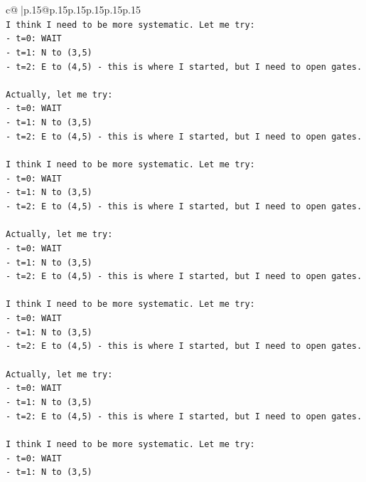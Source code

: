 \documentclass{article}
\begin{document}
{\begin{supertabular}{c@{$\;$}|p{.15\linewidth}@{}p{.15\linewidth}p{.15\linewidth}p{.15\linewidth}p{.15\linewidth}p{.15\linewidth}}
{{{\\ 
\texttt{I think I need to be more systematic. Let me try:} \\
\texttt{{-} t=0: WAIT} \\
\texttt{{-} t=1: N to (3,5)} \\
\texttt{{-} t=2: E to (4,5) {-} this is where I started, but I need to open gates.} \\
\\ 
\texttt{Actually, let me try:} \\
\texttt{{-} t=0: WAIT} \\
\texttt{{-} t=1: N to (3,5)} \\
\texttt{{-} t=2: E to (4,5) {-} this is where I started, but I need to open gates.} \\
\\ 
\texttt{I think I need to be more systematic. Let me try:} \\
\texttt{{-} t=0: WAIT} \\
\texttt{{-} t=1: N to (3,5)} \\
\texttt{{-} t=2: E to (4,5) {-} this is where I started, but I need to open gates.} \\
\\ 
\texttt{Actually, let me try:} \\
\texttt{{-} t=0: WAIT} \\
\texttt{{-} t=1: N to (3,5)} \\
\texttt{{-} t=2: E to (4,5) {-} this is where I started, but I need to open gates.} \\
\\ 
\texttt{I think I need to be more systematic. Let me try:} \\
\texttt{{-} t=0: WAIT} \\
\texttt{{-} t=1: N to (3,5)} \\
\texttt{{-} t=2: E to (4,5) {-} this is where I started, but I need to open gates.} \\
\\ 
\texttt{Actually, let me try:} \\
\texttt{{-} t=0: WAIT} \\
\texttt{{-} t=1: N to (3,5)} \\
\texttt{{-} t=2: E to (4,5) {-} this is where I started, but I need to open gates.} \\
\\ 
\texttt{I think I need to be more systematic. Let me try:} \\
\texttt{{-} t=0: WAIT} \\
\texttt{{-} t=1: N to (3,5)} \\
}}}
\end{supertabular}}
\end{document}
